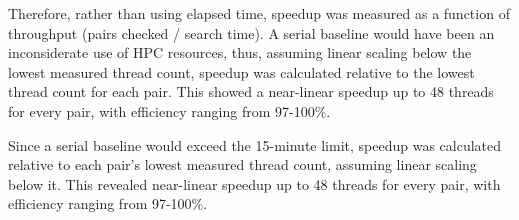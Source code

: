 \documentclass[11pt,a4paper]{article}
\begin{document}
Therefore, rather than using elapsed time, speedup was measured as a function of throughput (pairs checked / search time). A serial baseline would have been an inconsiderate use of HPC resources, thus, assuming linear scaling below the lowest measured thread count, speedup was calculated relative to the lowest thread count for each pair. This showed a near-linear speedup up to 48 threads for every pair, with efficiency ranging from 97-100\%.

Since a serial baseline would exceed the 15-minute limit, speedup was calculated relative to each pair's lowest measured thread count, assuming linear scaling below it. This revealed near-linear speedup up to 48 threads for every pair, with efficiency ranging from 97-100\%.

\end{document}
